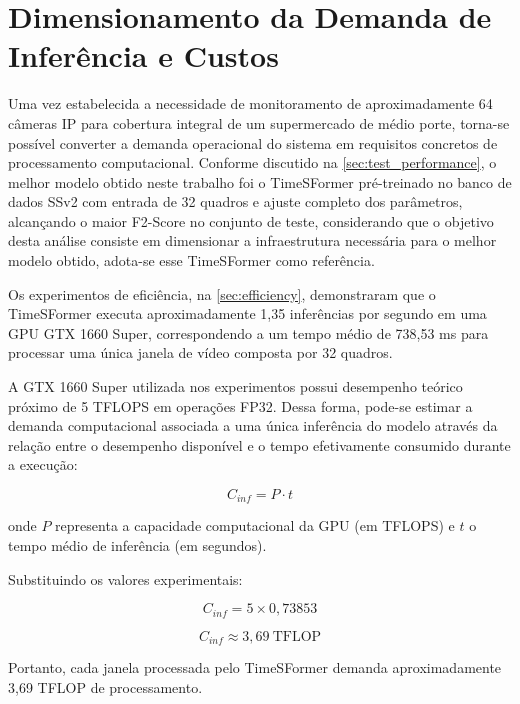 \documentclass[12pt, %
openright, 
oneside, %
a4paper,    %
brazil]{facom-ufu-abntex2}
\begin{document}
\section[Dimensionamento da Demanda de Inferência e Custos]{Dimensionamento da Demanda de Inferência e Custos}
\label{sec:estimativa_investimento}
Uma vez estabelecida a necessidade de monitoramento de aproximadamente 64 câmeras IP para cobertura integral de um supermercado de médio porte, torna-se possível converter a demanda operacional do sistema em requisitos concretos de processamento computacional. Conforme discutido na \autoref{sec:test_performance}, o melhor modelo obtido neste trabalho foi o TimeSFormer pré-treinado no banco de dados SSv2 com entrada de 32 quadros e ajuste completo dos parâmetros, alcançando o maior F2-Score no conjunto de teste, considerando que o objetivo desta análise consiste em dimensionar a infraestrutura necessária para o melhor modelo obtido, adota-se esse TimeSFormer como referência.

Os experimentos de eficiência, na \autoref{sec:efficiency}, demonstraram que o TimeSFormer executa aproximadamente 1,35 inferências por segundo em uma GPU GTX 1660 Super, correspondendo a um tempo médio de 738,53 ms para processar uma única janela de vídeo composta por 32 quadros.

A GTX 1660 Super utilizada nos experimentos possui desempenho teórico próximo de 5 TFLOPS em operações FP32. Dessa forma, pode-se estimar a demanda computacional associada a uma única inferência do modelo através da relação entre o desempenho disponível e o tempo efetivamente consumido durante a execução:

\begin{equation}
C_{inf}=P \cdot t
\end{equation}

onde $P$ representa a capacidade computacional da GPU (em TFLOPS) e $t$ o tempo médio de inferência (em segundos).

Substituindo os valores experimentais:

\begin{equation}
C_{inf}=5 \times 0,73853
\end{equation}

\begin{equation}
C_{inf}\approx 3,69\ \text{TFLOP}
\end{equation}

Portanto, cada janela processada pelo TimeSFormer demanda aproximadamente 3,69 TFLOP de processamento.
\end{document}
